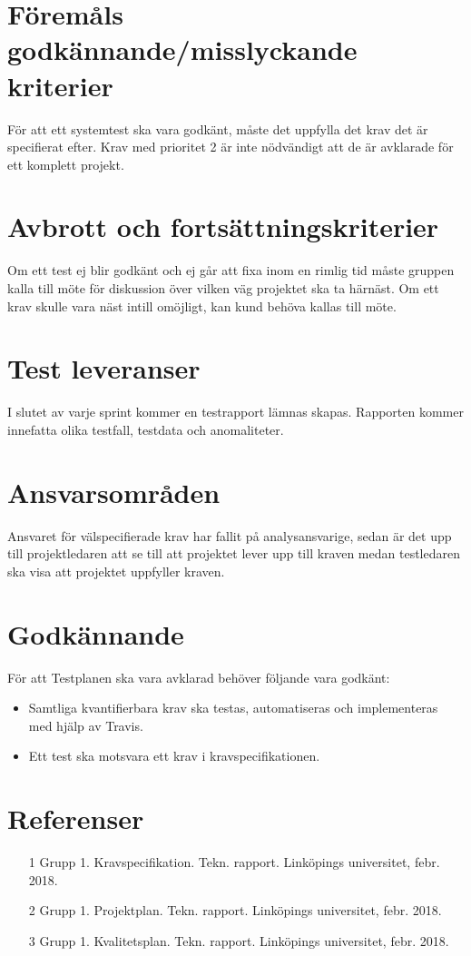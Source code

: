 \documentclass[10pt]{article}
\begin{document}
	
	

\section{Föremåls godkännande/misslyckande kriterier}
	För att ett systemtest ska vara godkänt, måste det uppfylla det krav det är specifierat efter. Krav med prioritet 2 är inte nödvändigt att de är avklarade för ett komplett projekt.\\


\section{Avbrott och fortsättningskriterier}
	Om ett test ej blir godkänt och ej går att fixa inom en rimlig tid måste gruppen kalla till möte för diskussion över vilken väg projektet ska ta härnäst. Om ett krav skulle vara näst intill omöjligt, kan kund behöva kallas till möte.
	



\section{Test leveranser}
	I slutet av varje sprint kommer en testrapport lämnas skapas. Rapporten kommer innefatta olika testfall, testdata och anomaliteter.




\section{Ansvarsområden}
	Ansvaret för välspecifierade krav har fallit på analysansvarige, sedan är det upp till projektledaren att se till att projektet lever upp till kraven medan testledaren ska visa att projektet uppfyller kraven.

  

	
	
\section{Godkännande}
	För att Testplanen ska vara avklarad behöver följande vara godkänt:
	\begin{itemize}
	 \item Samtliga kvantifierbara krav ska testas, automatiseras och implementeras med hjälp av Travis.
	 \item Ett test ska motsvara ett krav i kravspecifikationen.
	\end{itemize}
	


\section{Referenser}
	\begin{itemize}
	\item [1] Grupp 1. Kravspecifikation. Tekn. rapport. Linköpings universitet, febr. 2018.
	\item [2] Grupp 1. Projektplan. Tekn. rapport. Linköpings universitet, febr. 2018.
	\item [3] Grupp 1. Kvalitetsplan. Tekn. rapport. Linköpings universitet, febr. 2018.
	\end{itemize}
\end{document}
